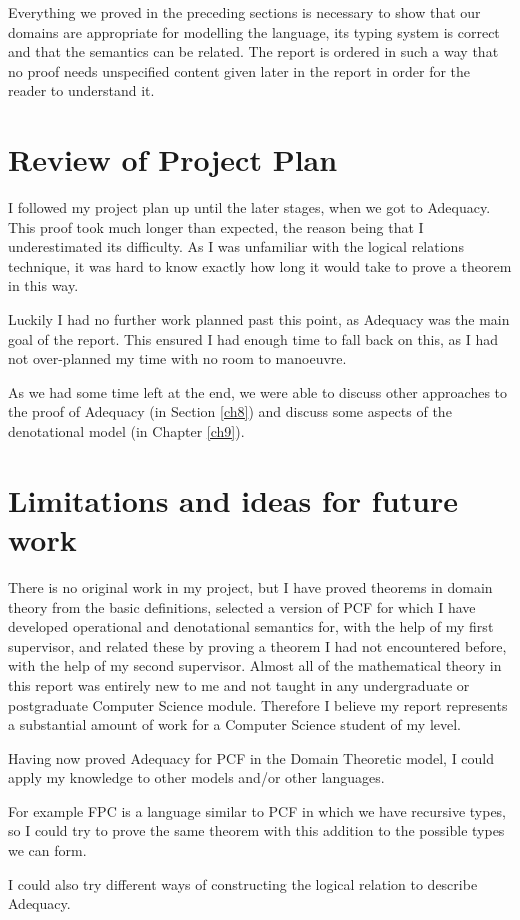 Everything we proved in the preceding sections is necessary to show that our domains are appropriate for modelling the language, its typing system is correct and that the semantics can be related. The report is ordered in such a way that no proof needs unspecified content given later in the report in order for the reader to understand it. 

\section{Review of Project Plan}
I followed my project plan up until the later stages, when we got to Adequacy. This proof took much longer than expected, the reason being that I underestimated its difficulty. As I was unfamiliar with the logical relations technique, it was hard to know exactly how long it would take to  prove a theorem in this way.

 Luckily I had no further work planned past this point, as Adequacy was the main goal of the report. This ensured I had enough time to fall back on this, as I had not over-planned my time with no room to manoeuvre. 
 
As we had some time left at the end, we were able to discuss other approaches to the proof of Adequacy (in Section \ref{ch8}) and discuss some  aspects of the denotational model (in Chapter \ref{ch9}).

\section{Limitations and ideas for future work}
There is no original work in my project, but I have proved theorems in domain theory from the basic definitions, selected a version of PCF for which I have developed operational and denotational semantics for, with the help of my first supervisor, and related these by proving a theorem I had not encountered before, with the help of my second supervisor. Almost all of the mathematical theory in this report was entirely new to me and not taught in any undergraduate or postgraduate Computer Science module. Therefore I believe my report represents a substantial amount of work for a Computer Science student of my level.   

Having now proved Adequacy for PCF in the Domain Theoretic model, I could apply my knowledge to other models and/or other languages.


For example FPC is a language similar to PCF in which we have recursive types, so I could try to prove the same theorem with this addition to the possible types we can form.

I could also try different ways of constructing the logical relation to describe Adequacy.











